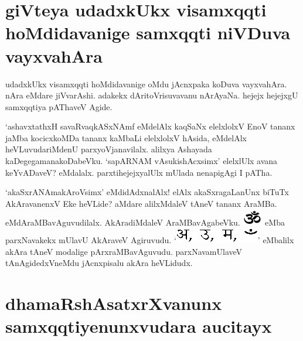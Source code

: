 \section*{giVteya udadxkUkx visamxqqti hoMdidavanige samxqqti niVDuva vayxvahAra}

udadxkUkx visamxqqti hoMdidavanige oMdu jAcnxpaka koDuva vayxvahAra. nAra eMdare jiVvarAshi. adakekx dAritoVrisuvavanu nArAyaNa. hejejx hejejxgU samxqqtiya pAThaveV Agide.

`ashavxtathxH savaRvaqkASxNAmf\label{93d} eMdelAlx kaqSaNx elelxlolxV EnoV tananx jaMba kocicxkoMDa tananx kaMbaLi elelxlolxV hAsida, eMdelAlx heVLuvudariMdenU parxyoVjanavilalx. alilxya Ashayada kaDegegamanakoDabeVku. `sapARNAM vAsukishAcx\s simx'\label{93b} elelxlUlx avana keYvADaveV? eMdalalx. parxtihejejxyalUlx mUlada nenapigAgi I pATha. 

`akaSxrANAmakAroV\s simx'\label{93c} eMdidAdxnalAlx! elAlx akaSxragaLanUnx biTuTx AkAravanenxV Eke heVLide? aMdare alilxMdaleV tAneV tananx AraMBa. {} eMdAraMBavAguvudilalx. AkAradiMdaleV AraMBavAgabeVku. \includegraphics{Om-PNG.eps} eMba parxNavakekx mUlavU AkAraveV Agiruvudu. `\includegraphics{symbol.eps}' eMbalilx akAra tAneV modalige pArxraMBavAguvudu. parxNavamUlaveV tAnAgidedxVneMdu jAcnxpisalu akAra heVLidudx. 

\section*{dhamaRshAsatxrXvanunx samxqqtiyenunxvudara aucitayx}

